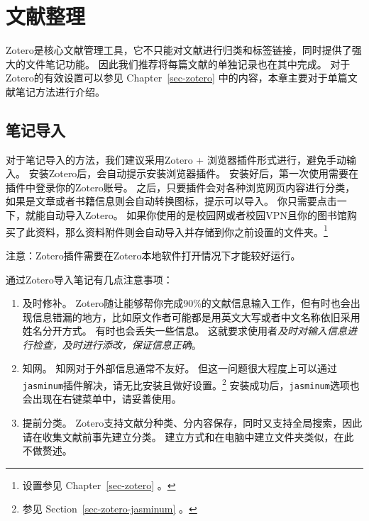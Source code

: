 \documentclass[
  letterpaper,
  DIV=11,
  numbers=noendperiod,
  oneside]{scrreprt}
\providecommand{\tightlist}{%
  \setlength{\itemsep}{0pt}\setlength{\parskip}{0pt}}\usepackage{longtable,booktabs,array}
\begin{document}
\hypertarget{sec-lit}{%
\chapter{文献整理}\label{sec-lit}}

Zotero是核心文献管理工具，它不只能对文献进行归类和标签链接，同时提供了强大的文件笔记功能。
因此我们推荐将每篇文献的单独记录也在其中完成。
对于Zotero的有效设置可以参见 Chapter~\ref{sec-zotero}
中的内容，本章主要对于单篇文献笔记方法进行介绍。

\hypertarget{ux7b14ux8bb0ux5bfcux5165}{%
\section{笔记导入}\label{ux7b14ux8bb0ux5bfcux5165}}

对于笔记导入的方法，我们建议采用Zotero +
浏览器插件形式进行，避免手动输入。
安装Zotero后，会自动提示安装浏览器插件。
安装好后，第一次使用需要在插件中登录你的Zotero账号。
之后，只要插件会对各种浏览网页内容进行分类，如果是文章或者书籍信息则会自动转换图标，提示可以导入。
你只需要点击一下，就能自动导入Zotero。
如果你使用的是校园网或者校园VPN且你的图书馆购买了此资料，那么资料附件则会自动导入并存储到你之前设置的文件夹。\footnote{设置参见
  Chapter~\ref{sec-zotero} 。}

\begin{tcolorbox}[enhanced jigsaw, arc=.35mm, breakable, coltitle=black, colframe=quarto-callout-note-color-frame, toptitle=1mm, colbacktitle=quarto-callout-note-color!10!white, leftrule=.75mm, left=2mm, bottomtitle=1mm, rightrule=.15mm, title=\textcolor{quarto-callout-note-color}{\faInfo}\hspace{0.5em}{Note}, opacityback=0, bottomrule=.15mm, titlerule=0mm, opacitybacktitle=0.6, colback=white, toprule=.15mm]
注意：Zotero插件需要在Zotero本地软件打开情况下才能较好运行。
\end{tcolorbox}

通过Zotero导入笔记有几点注意事项：

\begin{enumerate}
\def\labelenumi{\arabic{enumi}.}
\tightlist
\item
  及时修补。
  Zotero随让能够帮你完成90\%的文献信息输入工作，但有时也会出现信息错漏的地方，比如原文作者可能都是用英文大写或者中文名称依旧采用姓名分开方式。
  有时也会丢失一些信息。
  这就要求使用者\emph{及时对输入信息进行检查，及时进行添改，保证信息正确}。
\item
  知网。 知网对于外部信息通常不友好。
  但这一问题很大程度上可以通过\texttt{jasminum}插件解决，请无比安装且做好设置。\footnote{参见
    Section~\ref{sec-zotero-jasminum} 。}
  安装成功后，\texttt{jasminum}选项也会出现在右键菜单中，请妥善使用。
\item
  提前分类。
  Zotero支持文献分种类、分内容保存，同时又支持全局搜索，因此请在收集文献前事先建立分类。
  建立方式和在电脑中建立文件夹类似，在此不做赘述。
\end{enumerate}
\end{document}
